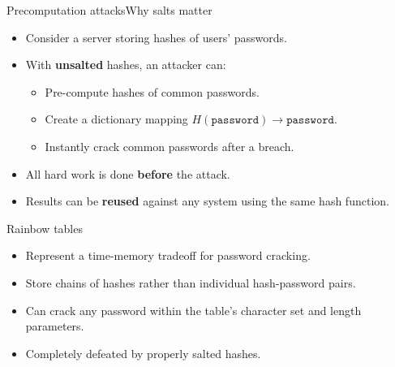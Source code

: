\documentclass[aspectratio=169, lualatex, handout]{beamer}
\begin{document}
\begin{frame}{Precomputation attacks}{Why salts matter}
	\begin{itemize}
		\item Consider a server storing hashes of users' passwords.
		\item With \textbf{unsalted} hashes, an attacker can:
		      \begin{itemize}
			      \item Pre-compute hashes of common passwords.
			      \item Create a dictionary mapping $H(\texttt{password}) \rightarrow \texttt{password}$.
			      \item Instantly crack common passwords after a breach.
		      \end{itemize}
		\item All hard work is done \textbf{before} the attack.
		\item Results can be \textbf{reused} against any system using the same hash function.
	\end{itemize}
\end{frame}

\begin{frame}{Rainbow tables}
	\begin{itemize}
		\item Represent a time-memory tradeoff for password cracking.
		\item Store chains of hashes rather than individual hash-password pairs.
		\item Can crack any password within the table's character set and length parameters.
		\item Completely defeated by properly salted hashes.
	\end{itemize}
\end{frame}
\end{document}
